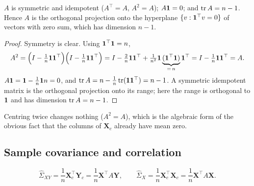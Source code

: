 \begin{notechapter}
\begin{proposition}[Properties of $A$]\label{covariance-estimation:prop:centring}
$A$ is symmetric and idempotent ($A^\top = A$, $A^2 = A$); $A\mathbf{1} = 0$; and
$\operatorname{tr} A = n - 1$. Hence $A$ is the orthogonal projection onto the hyperplane
$\{v : \mathbf{1}^\top v = 0\}$ of vectors with zero sum, which has dimension $n-1$.
\end{proposition}

\begin{proof}
Symmetry is clear. Using $\mathbf{1}^\top\mathbf{1} = n$,
\[
  A^2 = \Bigl(I - \tfrac1n\mathbf{1}\mathbf{1}^\top\Bigr)\Bigl(I - \tfrac1n\mathbf{1}\mathbf{1}^\top\Bigr)
  = I - \tfrac2n\mathbf{1}\mathbf{1}^\top + \tfrac1{n^2}\mathbf{1}\underbrace{(\mathbf{1}^\top\mathbf{1})}_{=\,n}\mathbf{1}^\top
  = I - \tfrac1n\mathbf{1}\mathbf{1}^\top = A .
\]
$A\mathbf{1} = \mathbf{1} - \frac1n\mathbf{1} n = 0$, and $\operatorname{tr} A = n - \frac1n\operatorname{tr}(\mathbf{1}\mathbf{1}^\top) = n - 1$.
A symmetric idempotent matrix is the orthogonal projection onto its range; here
the range is orthogonal to $\mathbf{1}$ and has dimension $\operatorname{tr} A = n-1$.
\end{proof}

Centring twice changes nothing ($A^2 = A$), which is the algebraic form of the
obvious fact that the columns of $\mathbf X_c$ already have mean zero.

\subsection{Sample covariance and correlation}

\begin{definition}
\[
  \hat\Sigma_{XY} = \frac1n\mathbf X_c^\top\mathbf Y_c = \frac1n\mathbf X^\top A\mathbf Y,
  \qquad
  \hat\Sigma_X = \frac1n\mathbf X_c^\top\mathbf X_c = \frac1n\mathbf X^\top A\mathbf X .
\]
\end{definition}


\end{notechapter}
